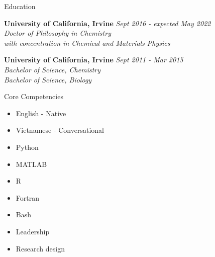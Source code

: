 \documentclass{resume} %
\begin{document}
{\centerline { } }

\begin{rSection}{Education}

{\bf University of California, Irvine} \hfill {\em Sept 2016 - expected May 2022} 
\\{\textit{Doctor of Philosophy in Chemistry \\
    with concentration in Chemical and Materials Physics}}

{\bf University of California, Irvine} \hfill {\em Sept 2011 - Mar 2015} 
\\ { \textit{Bachelor of Science, Chemistry}} \hfill
\\ { \textit{Bachelor of Science, Biology}} \hfill


\end{rSection}

\begin{rSection}{Core Competencies}

  \begin{multicols}{3}
    \begin{itemize}
    \setlength\itemsep{-0.75em}
    \item English - Native
    \item Vietnamese - Conversational
    \item Python
    \item MATLAB
    \item R
    \item Fortran
    \item Bash
    \item Leadership
    \item Research design
    \end{itemize}
  \end{multicols}
    
\end{rSection}
\end{document}
